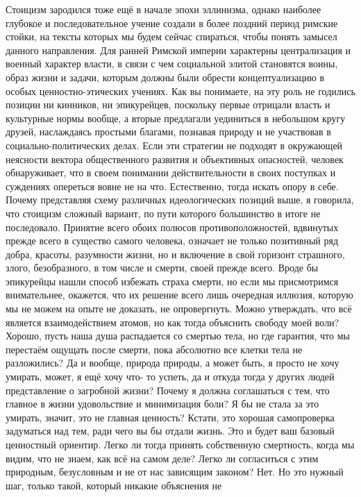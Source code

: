 Стоицизм зародился тоже ещё в начале эпохи эллинизма, однако наиболее глубокое и
последовательное учение создали в более поздний период римские стойки, на тексты
которых мы будем сейчас спираться, чтобы понять замысел данного направления. Для
ранней Римской империи характерны централизация и военный характер власти, в
связи с чем социальной элитой становятся воины, образ жизни и задачи, которым
должны были обрести концептуализацию в особых ценностно-этических учениях. Как
вы понимаете, на эту роль не годились позиции ни кинников, ни эпикурейцев,
поскольку первые отрицали власть и культурные нормы вообще, а вторые предлагали
уединиться в небольшом кругу друзей, наслаждаясь простыми благами, познавая
природу и не участвовав в социально-политических делах. Если эти стратегии не
подходят в окружающей неясности вектора общественного развития и объективных
опасностей, человек обнаруживает, что в своем понимании действительности в своих
поступках и суждениях опереться вовне не на что. Естественно, тогда искать опору
в себе. Почему представляя схему различных идеологических позиций выше, я
говорила, что стоицизм сложный вариант, по пути которого большинство в итоге не
последовало. Принятие всего обоих полюсов противоположностей, вдвинутых прежде
всего в существо самого человека, означает не только позитивный ряд добра,
красоты, разумности жизни, но и включение в свой горизонт страшного, злого,
безобразного, в том числе и смерти, своей прежде всего. Вроде бы эпикурейцы
нашли способ избежать страха смерти, но если мы присмотримся внимательнее,
окажется, что их решение всего лишь очередная иллюзия, которую мы не можем на
опыте не доказать, не опровергнуть. Можно утверждать, что всё является
взаимодействием атомов, но как тогда объяснить свободу моей воли? Хорошо, пусть
наша душа распадается со смертью тела, но где гарантия, что мы перестаём ощущать
после смерти, пока абсолютно все клетки тела не разложились? Да и вообще,
природа природы, а может быть, я просто не хочу умирать, может, я ещё хочу что-
то успеть, да и откуда тогда у других людей представление о загробной жизни?
Почему я должна соглашаться с тем, что главное в жизни удовольствие и
минимизация боли? Я бы не стала за это умирать, значит, это не главная ценность?
Кстати, это хорошая самопроверка задуматься над тем, ради чего вы бы отдали
жизнь. Это и будет ваш базовый ценностный ориентир. Легко ли тогда принять
собственную смертность, когда мы видим, что не знаем, как всё на самом деле?
Легко ли согласиться с этим природным, безусловным и не от нас зависящим
законом? Нет. Но это нужный шаг, только такой, который никакие объяснения не

